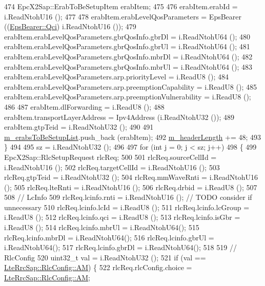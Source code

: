\begin{DoxyCode}
474       EpcX2Sap::ErabToBeSetupItem erabItem;
475 
476       erabItem.erabId = i.ReadNtohU16 ();
477  
478       erabItem.erabLevelQosParameters = EpsBearer ((\hyperlink{structns3_1_1EpsBearer_aecf0c67109c5eb4ec0b07226fff5885e}{EpsBearer::Qci}) i.ReadNtohU16 ());
479       erabItem.erabLevelQosParameters.gbrQosInfo.gbrDl = i.ReadNtohU64 ();
480       erabItem.erabLevelQosParameters.gbrQosInfo.gbrUl = i.ReadNtohU64 ();
481       erabItem.erabLevelQosParameters.gbrQosInfo.mbrDl = i.ReadNtohU64 ();
482       erabItem.erabLevelQosParameters.gbrQosInfo.mbrUl = i.ReadNtohU64 ();
483       erabItem.erabLevelQosParameters.arp.priorityLevel = i.ReadU8 ();
484       erabItem.erabLevelQosParameters.arp.preemptionCapability = i.ReadU8 ();
485       erabItem.erabLevelQosParameters.arp.preemptionVulnerability = i.ReadU8 ();
486 
487       erabItem.dlForwarding = i.ReadU8 ();
488       erabItem.transportLayerAddress = Ipv4Address (i.ReadNtohU32 ());
489       erabItem.gtpTeid = i.ReadNtohU32 ();
490 
491       \hyperlink{classns3_1_1EpcX2HandoverRequestHeader_a201338ba8572bf4c8b88e5bc79ba1153}{m\_erabsToBeSetupList}.push\_back (erabItem);
492       \hyperlink{classns3_1_1EpcX2HandoverRequestHeader_a4b119b64b283c261afa23ca597627a03}{m\_headerLength} += 48;
493     \}
494 
495   sz = i.ReadNtohU32 ();  
496  
497   \textcolor{keywordflow}{for} (\textcolor{keywordtype}{int} j = 0; j < sz; j++)
498   \{
499     EpcX2Sap::RlcSetupRequest rlcReq;
500 
501     rlcReq.sourceCellId = i.ReadNtohU16 ();
502     rlcReq.targetCellId = i.ReadNtohU16 (); 
503     rlcReq.gtpTeid = i.ReadNtohU32 (); 
504     rlcReq.mmWaveRnti = i.ReadNtohU16 (); 
505     rlcReq.lteRnti = i.ReadNtohU16 ();
506     rlcReq.drbid = i.ReadU8 ();
507 
508     \textcolor{comment}{// LcInfo}
509     rlcReq.lcinfo.rnti = i.ReadNtohU16 (); \textcolor{comment}{// TODO consider if unnecessary}
510     rlcReq.lcinfo.lcId = i.ReadU8      ();
511     rlcReq.lcinfo.lcGroup = i.ReadU8   ();
512     rlcReq.lcinfo.qci = i.ReadU8       ();
513     rlcReq.lcinfo.isGbr = i.ReadU8     ();
514     rlcReq.lcinfo.mbrUl = i.ReadNtohU64();
515     rlcReq.lcinfo.mbrDl = i.ReadNtohU64();
516     rlcReq.lcinfo.gbrUl = i.ReadNtohU64();
517     rlcReq.lcinfo.gbrDl = i.ReadNtohU64();
518 
519     \textcolor{comment}{// RlcConfig}
520     uint32\_t val = i.ReadNtohU32 ();
521     \textcolor{keywordflow}{if} (val == \hyperlink{structns3_1_1LteRrcSap_1_1RlcConfig_ab6ab94ca4abaf717926f31db4dddc61baac722b7609a143367fc24a94f8e4f6c7}{LteRrcSap::RlcConfig::AM}) \{
522       rlcReq.rlcConfig.choice = \hyperlink{structns3_1_1LteRrcSap_1_1RlcConfig_ab6ab94ca4abaf717926f31db4dddc61baac722b7609a143367fc24a94f8e4f6c7}{LteRrcSap::RlcConfig::AM};

\end{DoxyCode}
